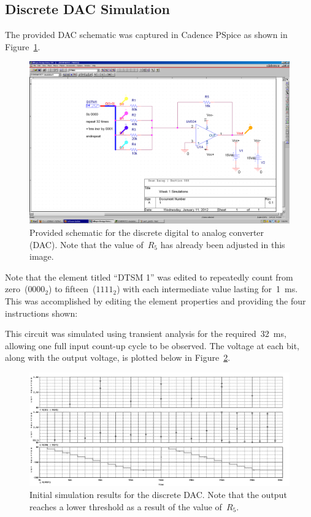 \subsection{Discrete DAC Simulation}
The provided DAC schematic was captured in Cadence PSpice as shown in
Figure~\ref{f:dac_schem}.
%
\begin{figure}[H]
\centering
	\includegraphics[width=.8\textwidth]{img/shot/part1_schem.PNG}
	\parbox{.8\textwidth}{
	\caption[Discrete DAC --- Schematic]{Provided schematic for the discrete
	digital to analog converter (DAC).  Note that the value of~$R_5$ has
	already been adjusted in this image.}
	\label{f:dac_schem}}
\end{figure}
%
Note that the element titled ``DTSM 1'' was edited to repeatedly count from
zero~($0000_2$) to fifteen~($1111_2$) with each intermediate value
lasting for~\SI{1}{\milli\second}.  This was accomplished by editing the
element properties and providing the four instructions shown:
%
\begin{itemize*}
	\item {}
	\item {}
	\item {}
	\item {}
\end{itemize*}
%
This circuit was simulated using transient analysis for the
required~\SI{32}{\milli\second}, allowing one full input count-up cycle to be
observed.  The voltage at each bit, along with the output voltage, is plotted
below in Figure~\ref{f:dac_plot1}.
%
\begin{figure}[H]
\centering
	\includegraphics[width=.8\textwidth]{img/plot/part1_plot1b.PNG}
	\parbox{.8\textwidth}{
	\caption[Discrete DAC --- Initial Results]{Initial simulation results for
	the discrete DAC.  Note that the output reaches a lower threshold as a
	result of the value of~$R_5$.}
	\label{f:dac_plot1}}
\end{figure}
